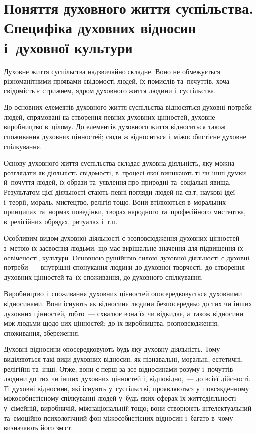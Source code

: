 \documentclass[a5paper,oneside,DIV=12,12pt,headings=small]{scrartcl}
\begin{document}
	\section{Поняття духовного життя суспільства. Специфіка духовних відносин і~духовної культури}
		Духовне життя суспільства надзвичайно складне. Воно не обмежується різноманітними проявами свідомості людей, їх помислів та~почуттів, хоча свідомість є стрижнем, ядром духовного життя людини і~суспільства.
		
		До основних елементів духовного життя суспільства відносяться духовні потреби людей, спрямовані на створення певних духовних цінностей, духовне виробництво в~цілому. До елементів духовного життя відноситься також споживання духовних цінностей; сюди ж відноситься і~міжособистісне духовне спілкування.
		
		Основу духовного життя суспільства складає духовна діяльність, яку можна розглядати як діяльність свідомості, в~процесі якої виникають ті чи інші думки й~почуття людей, їх образи та~уявлення про природні та~соціальні явища. Результатом цієї діяльності стають певні погляди людей на світ, наукові ідеї і~теорії, мораль, мистецтво, релігія тощо. Вони втілюються в~моральних принципах та~нормах поведінки, творах народного та~професійного мистецтва, в~релігійних обрядах, ритуалах і~т.п.
		
		Особливим видом духовної діяльності є розповсюдження духовних цінностей з~метою їх засвоєння людьми, що має вирішальне значення для підвищення їх освіченості, культури. Основною рушійною силою духовної діяльності є духовні потреби~— внутрішні спонукання людини до духовної творчості, до створення духовних цінностей та~їх споживання, до духовного спілкування.
		
		Виробництво і~споживання духовних цінностей опосередковується духовними відносинами. Вони існують як відносини людини безпосередньо до тих чи інших духовних цінностей, тобто~— схвалює вона їх чи відкидає, а~також відносини між людьми щодо цих цінностей: до їх виробництва, розповсюдження, споживання, збереження.
		
		Духовні відносини опосередковують будь-яку духовну діяльність. Тому виділяються такі види духовних відносин, як пізнавальні, моральні, естетичні, релігійні та~інші. Отже, вони є перш за все відносинами розуму і~почуттів людини до тих чи інших духовних цінностей і, відповідно,~— до всієї дійсності. Ті духовні відносини, які існують у~суспільстві, проявляються у~повсякденному міжособистісному спілкуванні людей у~будь-яких сферах їх життєдіяльності~— у~сімейній, виробничій, міжнаціональній тощо; вони створюють інтелектуальний та~емоційно-психологічний фон міжособистісних відносин і~багато в~чому визначають його зміст.
		
\end{document}
